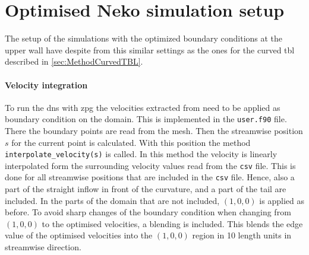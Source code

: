 \section{Optimised Neko simulation setup}

The setup of the simulations with the optimized boundary conditions at the upper wall have despite from this similar settings as the ones for the curved \acrshort{tbl} described in \autoref{sec:MethodCurvedTBL}.

\paragraph{Velocity integration}

To run the \acrshort{dns} with \acrfull{zpg} the velocities extracted from  need to be applied as boundary condition on the  domain. 
This is implemented in the \texttt{user.f90} file. 
There the boundary points are read from the mesh. 
Then the streamwise position $s$ for the current point is calculated.
With this position the method \texttt{interpolate_velocity(s)} is called.
In this method the velocity is linearly interpolated form the surrounding velocity values read from the \texttt{csv} file.
This is done for all streamwise positions that are included in the \texttt{csv} file. 
Hence, also a part of the straight inflow in front of the curvature, and a part of the tail are included.
In the parts of the domain that are not included, $(1,0,0)$ is applied as before. 
To avoid sharp changes of the boundary condition when changing from $(1,0,0)$ to the optimised velocities, a blending is included.
This blends the edge value of the optimised velocities into the $(1,0,0)$ region in 10 length units in streamwise direction. 


